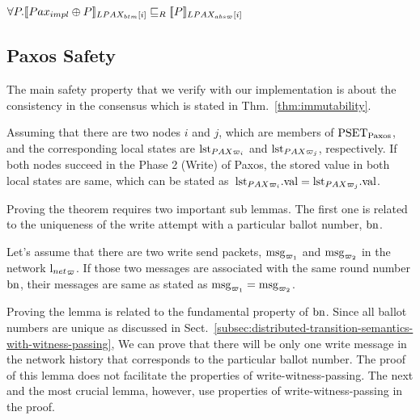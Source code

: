 \begin{theorem}
\label{thm:contextual-refinement-witness}
\noindent$\forall{}P.\sem{LPAX_{btm}[i]}{Pax_{impl} \oplus P} \refines_R \sem{LPAX_{abs\witness}[i]}{P}$
\end{theorem}


\subsection{Paxos Safety}
\label{subsec:paxos-safety}

The main safety property that we verify with our implementation is about the consistency in the consensus which 
is stated in Thm.~\ref{thm:immutability}.

\begin{theorem}[Immutability]
\label{thm:immutability}
Assuming that there are two nodes  $i$ and $j$, which are members of $\paxpropset$,
and the corresponding local states are  $\lstate{PAX\witness_i}$ and 
$\lstate{PAX\witness_j}$, respectively.
If both nodes succeed in the Phase 2 (Write) of Paxos, 
the stored value in both local states are same, which can be stated as\ $\lstate{PAX\witness_i}.\dsvalue  = \lstate{PAX\witness_j}.\dsvalue$.
\end{theorem}

Proving the theorem requires two important sub lemmas. 
The first one is related to the uniqueness of the write attempt with a particular ballot number, $\ballotnum$.

\begin{lemma}
\label{lemma:write-once}
Let's assume that there are two write send packets, $\msg_{\witness_1}$ and $\msg_{\witness_2}$
in the network ${\networklog}_{\witness}$. 
If those two messages are associated with the same round number $\ballotnum$, 
their messages are same as stated as $\msg_{\witness_1} = \msg_{\witness_2}$.
\end{lemma}

Proving the lemma is related to the fundamental property of $\ballotnum$.
Since all ballot numbers are unique as discussed in Sect.~\ref{subsec:distributed-transition-semantics-with-witness-passing}, 
We can prove that there will be only one write message in the network history that corresponds to the particular ballot number. 
The proof of this lemma does not facilitate the properties of  write-witness-passing. 
The next and the most crucial lemma, however, use properties of  write-witness-passing in the proof.

